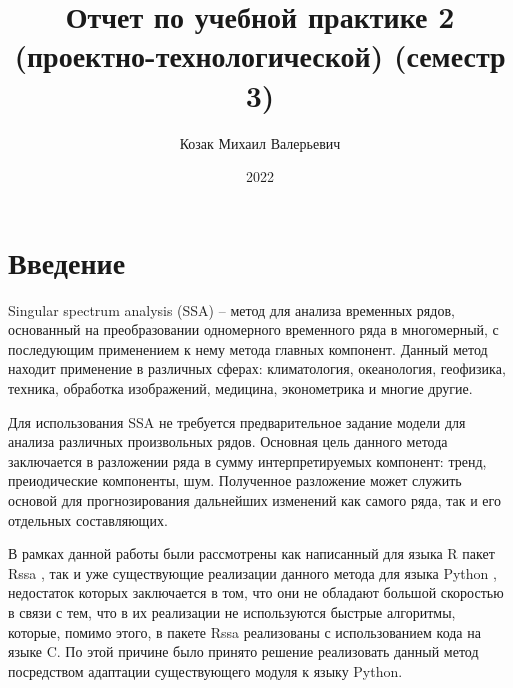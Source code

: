 \documentclass[specialist,
			   substylefile = spbu_report.rtx,
			   subf,href,colorlinks=true, 12pt]{disser}
\begin{document}
%
%

\title{Отчет по учебной практике 2 (проектно-технологической) (семестр 3)}


\author{Козак Михаил Валерьевич}


\date{2022}

\maketitle

\tableofcontents

\chapter{Введение}

Singular spectrum analysis (SSA) \cite{ssa-method} – метод для анализа временных рядов, основанный на преобразовании одномерного временного ряда в многомерный, с последующим применением к нему метода главных компонент. Данный метод находит применение в различных сферах: климатология, океанология, геофизика, техника, обработка изображений, медицина, эконометрика и многие другие.

Для использования SSA не требуется предварительное задание модели для анализа различных произвольных рядов. Основная цель данного метода заключается в разложении ряда в сумму интерпретируемых компонент: тренд, преиодические компоненты, шум. Полученное разложение может служить основой для  прогнозирования дальнейших изменений как самого ряда, так и его отдельных составляющих.

В рамках данной работы были рассмотрены как написанный для языка R пакет Rssa \cite{rssa-book, rssa-doc}, так и уже существующие реализации данного метода для языка Python \cite{pyts-doc, kaggle-ssa-doc, git-kieferc-doc}, недостаток которых заключается в том, что они не обладают большой скоростью в связи с тем, что в их реализации не используются быстрые алгоритмы, которые, помимо этого, в пакете Rssa реализованы с использованием кода на языке C. По этой причине было принято решение реализовать данный метод посредством адаптации существующего модуля к языку Python.
\end{document}
